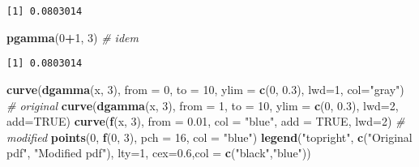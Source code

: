 \documentclass[]{book}
\newenvironment{Shaded}{\begin{snugshade}}{\end{snugshade}}
\newcommand{\KeywordTok}[1]{\textcolor[rgb]{0.13,0.29,0.53}{\textbf{#1}}}
\newcommand{\DataTypeTok}[1]{\textcolor[rgb]{0.13,0.29,0.53}{#1}}
\newcommand{\DecValTok}[1]{\textcolor[rgb]{0.00,0.00,0.81}{#1}}
\newcommand{\FloatTok}[1]{\textcolor[rgb]{0.00,0.00,0.81}{#1}}
\newcommand{\StringTok}[1]{\textcolor[rgb]{0.31,0.60,0.02}{#1}}
\newcommand{\CommentTok}[1]{\textcolor[rgb]{0.56,0.35,0.01}{\textit{#1}}}
\newcommand{\OtherTok}[1]{\textcolor[rgb]{0.56,0.35,0.01}{#1}}
\newcommand{\OperatorTok}[1]{\textcolor[rgb]{0.81,0.36,0.00}{\textbf{#1}}}
\newcommand{\NormalTok}[1]{#1}
\theoremstyle{definition}
\theoremstyle{definition}
\theoremstyle{definition}
\theoremstyle{remark}
\begin{document}
\begin{verbatim}
[1] 0.0803014
\end{verbatim}

\begin{Shaded}
\begin{Highlighting}[]
\KeywordTok{pgamma}\NormalTok{(}\DecValTok{0}\OperatorTok{+}\DecValTok{1}\NormalTok{, }\DecValTok{3}\NormalTok{) }\CommentTok{# idem}
\end{Highlighting}
\end{Shaded}

\begin{verbatim}
[1] 0.0803014
\end{verbatim}

\begin{Shaded}
\begin{Highlighting}[]
\KeywordTok{curve}\NormalTok{(}\KeywordTok{dgamma}\NormalTok{(x, }\DecValTok{3}\NormalTok{), }\DataTypeTok{from =} \DecValTok{0}\NormalTok{, }\DataTypeTok{to =} \DecValTok{10}\NormalTok{, }\DataTypeTok{ylim =} \KeywordTok{c}\NormalTok{(}\DecValTok{0}\NormalTok{, }\FloatTok{0.3}\NormalTok{), }\DataTypeTok{lwd=}\DecValTok{1}\NormalTok{, }\DataTypeTok{col=}\StringTok{"gray"}\NormalTok{) }\CommentTok{# original}
\KeywordTok{curve}\NormalTok{(}\KeywordTok{dgamma}\NormalTok{(x, }\DecValTok{3}\NormalTok{), }\DataTypeTok{from =} \DecValTok{1}\NormalTok{, }\DataTypeTok{to =} \DecValTok{10}\NormalTok{, }\DataTypeTok{ylim =} \KeywordTok{c}\NormalTok{(}\DecValTok{0}\NormalTok{, }\FloatTok{0.3}\NormalTok{), }\DataTypeTok{lwd=}\DecValTok{2}\NormalTok{, }\DataTypeTok{add=}\OtherTok{TRUE}\NormalTok{)}
\KeywordTok{curve}\NormalTok{(}\KeywordTok{f}\NormalTok{(x, }\DecValTok{3}\NormalTok{), }\DataTypeTok{from =} \FloatTok{0.01}\NormalTok{, }\DataTypeTok{col =} \StringTok{"blue"}\NormalTok{, }\DataTypeTok{add =} \OtherTok{TRUE}\NormalTok{, }\DataTypeTok{lwd=}\DecValTok{2}\NormalTok{) }\CommentTok{# modified}
\KeywordTok{points}\NormalTok{(}\DecValTok{0}\NormalTok{, }\KeywordTok{f}\NormalTok{(}\DecValTok{0}\NormalTok{, }\DecValTok{3}\NormalTok{), }\DataTypeTok{pch =} \DecValTok{16}\NormalTok{, }\DataTypeTok{col =} \StringTok{"blue"}\NormalTok{)}
\KeywordTok{legend}\NormalTok{(}\StringTok{"topright"}\NormalTok{, }\KeywordTok{c}\NormalTok{(}\StringTok{"Original pdf"}\NormalTok{, }\StringTok{"Modified pdf"}\NormalTok{), }\DataTypeTok{lty=}\DecValTok{1}\NormalTok{, }\DataTypeTok{cex=}\FloatTok{0.6}\NormalTok{,}\DataTypeTok{col =} \KeywordTok{c}\NormalTok{(}\StringTok{"black"}\NormalTok{,}\StringTok{"blue"}\NormalTok{))}
\end{Highlighting}
\end{Shaded}
\end{document}
